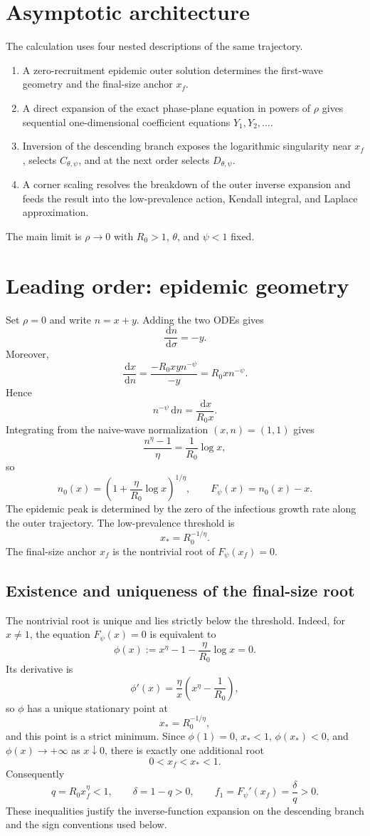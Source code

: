 \documentclass[11pt]{article}
\newcommand{\Rzero}{R_0}
\newcommand{\Fpsi}{F_\psi}
\newcommand{\Cpsi}{C_{\theta,\psi}}
\newcommand{\Dpsi}{D_{\theta,\psi}}
\newcommand{\xf}{x_f}
\newcommand{\xs}{x_*}
\newcommand{\dd}{\,\mathrm{d}}
\begin{document}
\section{Asymptotic architecture}
The calculation uses four nested descriptions of the same trajectory.
\begin{enumerate}
\item A zero-recruitment epidemic outer solution determines the first-wave geometry and the final-size anchor \(\xf\).
\item A direct expansion of the exact phase-plane equation in powers of \(\rho\) gives sequential one-dimensional coefficient equations \(Y_1,Y_2,\ldots\).
\item Inversion of the descending branch exposes the logarithmic singularity near \(\xf\), selects \(\Cpsi\), and at the next order selects \(\Dpsi\).
\item A corner scaling resolves the breakdown of the outer inverse expansion and feeds the result into the low-prevalence action, Kendall integral, and Laplace approximation.
\end{enumerate}
The main limit is \(\rho\to0\) with \(\Rzero>1\), \(\theta\), and \(\psi<1\) fixed.

\section{Leading order: epidemic geometry}
Set \(\rho=0\) and write \(n=x+y\). Adding the two ODEs gives
\[
\frac{\dd n}{\dd\sigma}=-y.
\]
Moreover,
\[
\frac{\dd x}{\dd n}
=\frac{-\Rzero xyn^{-\psi}}{-y}=\Rzero xn^{-\psi}.
\]
Hence
\[
n^{-\psi}\dd n=\frac{\dd x}{\Rzero x}.
\]
Integrating from the naive-wave normalization \((x,n)=(1,1)\) gives
\[
\frac{n^\eta-1}{\eta}=\frac1{\Rzero}\log x,
\]
so
\[
n_0(x)=\left(1+\frac{\eta}{\Rzero}\log x\right)^{1/\eta},
\qquad
\Fpsi(x)=n_0(x)-x.
\]
The epidemic peak is determined by the zero of the infectious growth rate along the outer trajectory. The low-prevalence threshold is
\[
\xs=\Rzero^{-1/\eta}.
\]
The final-size anchor \(\xf\) is the nontrivial root of \(\Fpsi(\xf)=0\).

\subsection{Existence and uniqueness of the final-size root}
The nontrivial root is unique and lies strictly below the threshold. Indeed, for \(x\neq1\), the equation \(F_\psi(x)=0\) is equivalent to
\[
\phi(x):=x^\eta-1-\frac{\eta}{R_0}\log x=0.
\]
Its derivative is
\[
\phi'(x)=\frac{\eta}{x}\left(x^\eta-\frac1{R_0}\right),
\]
so \(\phi\) has a unique stationary point at
\[
x_*=R_0^{-1/\eta},
\]
and this point is a strict minimum. Since \(\phi(1)=0\), \(x_*<1\), \(\phi(x_*)<0\), and \(\phi(x)\to+\infty\) as \(x\downarrow0\), there is exactly one additional root
\[
0<x_f<x_*<1.
\]
Consequently
\[
q=R_0x_f^\eta<1,
\qquad
\delta=1-q>0,
\qquad
f_1=F_\psi'(x_f)=\frac{\delta}{q}>0.
\]
These inequalities justify the inverse-function expansion on the descending branch and the sign conventions used below.
\end{document}
